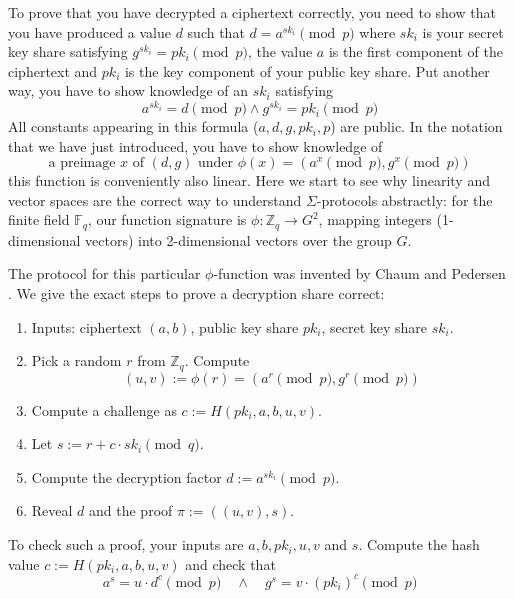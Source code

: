 \documentclass[envcountsame]{llncs}
\begin{document}
To prove that you have decrypted a ciphertext correctly, you need to show that
you have produced a value $d$ such that $d = a^{sk_i} \pmod{p}$ where $sk_i$ is
your secret key share satisfying $g^{sk_i} = pk_i \pmod{p}$, the value $a$ is
the first component of the ciphertext and $pk_i$ is the key component of your
public key share. Put another way, you have to show knowledge of an $sk_i$
satisfying
\[
a^{sk_i} = d \pmod{p} \wedge g^{sk_i} = pk_i \pmod{p}
\]
All constants appearing in this formula ($a, d, g, pk_i, p$) are public.
In the notation that we have just introduced, you have to show knowledge of
\[
\textrm{a preimage } x \textrm{ of } (d, g) \textrm { under } \phi(x) =
( a^x \pmod{p}, g^x \pmod{p})
\]
this function is conveniently also linear. Here we start to see why linearity
and vector spaces are the correct way to understand $\Sigma$-protocols 
abstractly: for the finite field $\mathbb F_q$, our function signature is
$\phi: \mathbb Z_q \to G^2$, mapping integers (1-dimensional vectors) into
2-dimensional vectors over the group $G$.

The protocol for this particular $\phi$-function was invented by Chaum and
Pedersen \cite{CP92}. We give the exact steps to prove a decryption share
correct:
\begin{enumerate}
\item Inputs: ciphertext $(a, b)$, public key share $pk_i$, secret key share
$sk_i$.
\item Pick a random $r$ from $\mathbb Z_q$. Compute 
\[
(u, v) := \phi(r) = (a^r \pmod{p}, g^r \pmod{p})
\]
\item Compute a challenge as $c := H(pk_i, a, b, u, v)$.
\item Let $s := r + c \cdot sk_i \pmod{q}$.
\item Compute the decryption factor $d := a^{sk_i} \pmod{p}$.
\item Reveal $d$ and the proof $\pi := ((u, v), s)$.
\end{enumerate}
To check such a proof, your inputs are $a, b, pk_i, u, v$ and $s$.
Compute the hash value $c := H(pk_i, a, b, u, v)$ and check that
\[
a^s = u \cdot d^c \pmod{p} \quad \wedge \quad g^s = v \cdot (pk_i)^c \pmod{p}
\]
\end{document}
